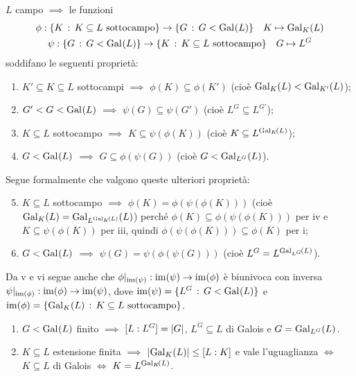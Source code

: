 
$L$ campo $\implies$ le funzioni
\begin{gather*}
\phi : \{K\st K\subseteq L\text{ sottocampo}\}\to\{G\st G<\Gal{L}\}\quad K\mapsto\Gal[K]{L} \\
\psi : \{G\st G<\Gal{L}\}\to\{K\st K\subseteq L\text{ sottocampo}\}\quad G\mapsto L^G
\end{gather*}
soddifano le seguenti propriet\`a:
\begin{enumerate}%
\item $K'\subseteq K\subseteq L$ sottocampi $\implies$ $\phi(K)\subseteq\phi(K')$ (cioè $\Gal[K]{L}<\Gal[K']{L}$);
\item $G'<G<\Gal{L}$ $\implies$ $\psi(G)\subseteq\psi(G')$ (cioè $L^G\subseteq L^{G'}$);
\item $K\subseteq L$ sottocampo $\implies$ $K\subseteq\psi(\phi(K))$ (cioè $K\subseteq L^{\Gal[K]{L}}$);
\item $G<\Gal{L}$ $\implies$ $G\subseteq\phi(\psi(G))$ (cioè $G<\Gal[L^G]{L}$).
\end{enumerate}
Segue formalmente che valgono queste ulteriori propriet\`a:
\begin{enumerate}%
\setcounter{enumi}{4}
\item $K\subseteq L$ sottocampo $\implies$ $\phi(K)=\phi(\psi(\phi(K)))$ (cioè $\Gal[K]{L}=\Gal[L^{\Gal[K]{L}}]{L}$) perché $\phi(K)\subseteq\phi(\psi(\phi(K)))$ per iv e $K\subseteq\psi(\phi(K))$ per iii, quindi $\phi(\psi(\phi(K)))\subseteq\phi(K)$ per i;
\item $G<\Gal{L}$ $\implies$ $\psi(G)=\psi(\phi(\psi(G)))$ (cioè $L^G=L^{\Gal[L^G]{L}}$).
\end{enumerate}

Da v e vi segue anche che $\phi\rest{\im(\psi)} : \im(\psi)\to\im(\phi)$ è biunivoca con inversa $\psi\rest{\im(\phi)} : \im(\phi)\to\im(\psi)$, dove $\im(\psi)=\{L^G\st G<\Gal{L}\}$ e $\im(\phi)=\{\Gal[K]{L}\st K\subseteq L\text{ sottocampo}\}$.

\begin{teor}
\begin{enumerate}
\item $G<\Gal{L}$ finito $\implies$ $[L:L^G]=\card{G}$, $L^G\subseteq L$ di Galois e $G=\Gal[L^G]{L}$.
\item $K\subseteq L$ estensione finita $\implies$ $\card{\Gal[K]{L}}\le[L:K]$ e vale l'uguaglianza $\iff$ $K\subseteq L$ di Galois $\iff$ $K=L^{\Gal[K]{L}}$.
\end{enumerate}
\end{teor}

